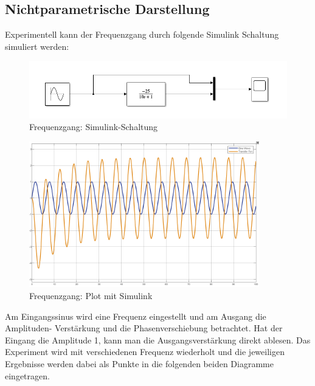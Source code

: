 \subsection{Nichtparametrische Darstellung}
Experimentell kann der Frequenzgang durch folgende Simulink Schaltung simuliert werden:
\begin{figure}[H]
    \centering
    \includegraphics[width=12cm]{images_2/Frequenzgang/frequenzgang_simulink_schakltung.png}
    \caption{Frequenzgang: Simulink-Schaltung}
\end{figure}
\begin{figure}[H]
    \centering
    \includegraphics[width=10cm]{images_2/Frequenzgang/frequenzgang_simulink_plot.png}
    \caption{Frequenzgang: Plot mit Simulink}
\end{figure}
\vspace*{0.5cm}
Am Eingangssinus wird eine Frequenz eingestellt und am Ausgang die Amplituden-
Verstärkung und die Phasenverschiebung betrachtet.
Hat der Eingang die Amplitude 1, kann man die Ausgangsverstärkung direkt
ablesen.
Das Experiment wird mit verschiedenen Frequenz wiederholt und die jeweiligen
Ergebnisse werden dabei als Punkte in die folgenden beiden Diagramme eingetragen.


